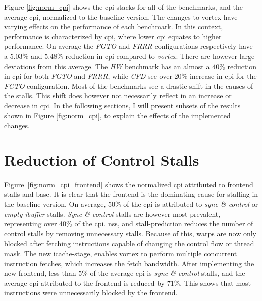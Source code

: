 Figure \ref{fig:norm_cpi} shows the \acrshort{cpi} stacks for all of the benchmarks, and the average \acrshort{cpi}, normalized to the baseline version. The changes to \Gls{vortex} have varying effects on the performance of each benchmark. In this context, performance is characterized by \acrshort{cpi}, where lower \acrshort{cpi} equates to higher performance. On average the \textit{FGTO} and \textit{FRRR}  configurations respectively have a $5.03\%$ and $5.48\%$ reduction in \acrshort{cpi} compared to \textit{\Gls{vortex}}. There are however large deviations from this average. The \textit{HW} benchmark has an almost a $40\%$ reduction in \acrshort{cpi} for both \textit{FGTO} and \textit{FRRR}, while \textit{CFD} see over $20\%$ increase in \acrshort{cpi} for the \textit{FGTO} configuration. Most of the benchmarks see a drastic shift in the causes of the stalls. This shift does however not necessarily reflect in an increase or decrease in \acrshort{cpi}. In the following sections, I will present subsets of the results shown in Figure \ref{fig:norm_cpi}, to explain the effects of the implemented changes.

\newpage
\section{Reduction of Control Stalls} \label{sec:result_control_stalls}

Figure~\ref{fig:norm_cpi_frontend} shows the normalized \acrshort{cpi} attributed to frontend stalls and base. It is clear that the frontend is the dominating cause for stalling in the baseline version. On average, 50\% of the \acrshort{cpi} is attributed to \textit{sync \& control} or \textit{empty ibuffer} stalls. \textit{Sync \& control} stalls are however most prevalent, representing over 40\% of the \acrshort{cpi}. \acrshort{nss}, and stall-prediction reduces the number of control stalls by removing unnecessary stalls. Because of this, warps are now only blocked after fetching instructions capable of changing the control flow or thread mask. The new icache-stage, enables \Gls{vortex} to perform multiple concurrent instruction fetches, which increases the fetch bandwidth. After implementing the new frontend, less than $5\%$ of the average \acrshort{cpi} is \textit{sync \& control} stalls, and the average \acrshort{cpi} attributed to the frontend is reduced by $71\%$. This shows that most instructions were unnecessarily blocked by the frontend. 


